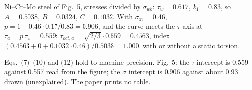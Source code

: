  Ni--Cr--Mo steel of Fig.~5, stresses divided by $\sigma_{wb}$:
$\tau_w=0.617$, $k_1=0.83$, so $A=0.5038$, $B=0.0324$, $C=0.1032$. With $\sigma_m=0.46$,
$p = 1-0.46\cdot0.17/0.83 = 0.906$, and the curve meets the $\tau$ axis at
$\tau_a = p\,\tau_w = 0.559$: $\tau_{oct,a}=\sqrt{2/3}\cdot0.559=0.4563$, index
$(0.4563+0+0.1032\cdot0.46)/0.5038 = 1.000$, with or without a static torsion.

 Eqs.~(7)--(10) and (12) hold to machine precision. Fig.~5: the $\tau$
intercept is 0.559 against 0.557 read from the figure; the $\sigma$ intercept is 0.906 against
about 0.93 drawn (unexplained). The paper prints no table.
